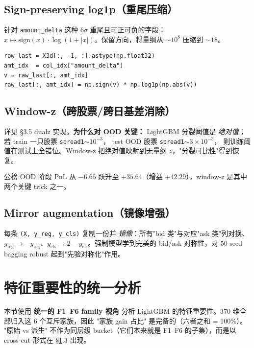 \documentclass[10.5pt,a4paper]{article}
\begin{document}
\subsection{Sign-preserving log1p（重尾压缩）}

针对 \texttt{amount\_delta} 这种 6$\sigma$ 重尾且可正可负的字段：$x \mapsto \mathrm{sign}(x)\cdot\log(1+|x|)$。保留方向，将量纲从 $\sim 10^8$ 压缩到 $\sim 18$。

\begin{lstlisting}
raw_last = X3d[:, -1, :].astype(np.float32)
amt_idx  = col_idx["amount_delta"]
v = raw_last[:, amt_idx]
raw_last[:, amt_idx] = np.sign(v) * np.log1p(np.abs(v))
\end{lstlisting}

\subsection{Window-z（跨股票/跨日基差消除）}

详见 §3.5 dualz 实现。\textbf{为什么对 OOD 关键：}
LightGBM 分裂阈值是 \emph{绝对值}；若 train 一只股票 \texttt{spread1}$\sim 10^{-3}$，
test OOD 股票 \texttt{spread1}$\sim 3{\times}10^{-3}$，
则训练阈值在测试上全错位。Window-z 把绝对值映射到无量纲 $z$，"分裂可比性"得到恢复。

公榜 OOD 阶段 PnL 从 $-6.65$ 跃升至 $+35.64$（增益 $+42.29$），window-z 是其中两个关键 trick 之一。

\subsection{Mirror augmentation（镜像增强）}

每条 \texttt{(X, y\_reg, y\_cls)} 复制一份并 \emph{镜像}：所有"bid 类"与对应"ask 类"列对换、$y_{\mathrm{reg}}\to -y_{\mathrm{reg}}$、$y_{\mathrm{cls}}\to 2-y_{\mathrm{cls}}$。强制模型学到完美的 bid/ask 对称性，对 50-seed bagging robust 起到"先验对称化"作用。

\section{特征重要性的统一分析}
\label{sec:imp}

本节使用 \textbf{统一的 F1--F6 family 视角} 分析 LightGBM 的特征重要性。370 维全部归入这 6 个互斥家族，因此 "家族 gain 占比" 是完备的（六者之和 = 100\%）。
"原始 vs 派生" 不作为同层级 bucket（它们本来就是 F1--F6 的子集），而是以 cross-cut 形式在 §\ref{sec:imp}.3 出现。
\end{document}
